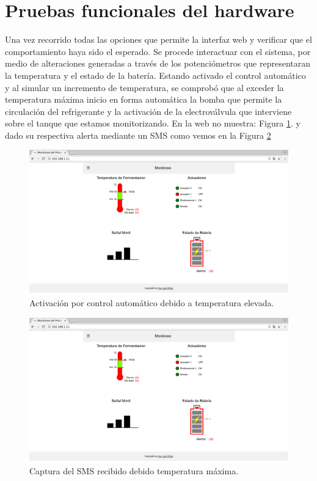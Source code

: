 
\section{Pruebas funcionales del hardware}
\label{sec:pruebasHW}

Una vez recorrido todas las opciones que permite la interfaz web y verificar que el comportamiento haya sido el esperado. Se procede interactuar con el sistema, por medio de alteraciones generadas a través de los potenciómetros que representaran la temperatura y el estado de la batería.
Estando activado el control automático y al simular un incremento de temperatura, se comprobó que al exceder la temperatura máxima inicio en forma automática la bomba que permite la circulación del refrigerante y la activación de la electroválvula que interviene sobre el tanque que estamos monitorizando. En la web no muestra: Figura \ref{fig:auto_control_active}. y dado su respectiva alerta mediante un SMS como vemos en la Figura \ref{fig:sms_temp_max}

\begin{figure}[h]
  \centering
  \includegraphics[scale=.25]{./Figures/auto_control_active.png}
  \caption{Activación por control automático debido a temperatura elevada.}
  \label{fig:auto_control_active}
\end{figure}


\begin{figure}[h]
  \centering
  \includegraphics[scale=.05]{./Figures/auto_control_active.png}
  \caption{Captura del SMS recibido debido temperatura máxima.}
  \label{fig:sms_temp_max}
\end{figure}

